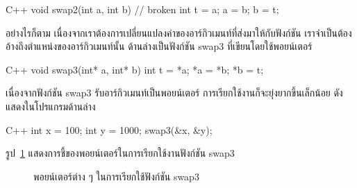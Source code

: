 \latintext
\begin{codelist}{C++}{}
void swap2(int a, int b)    // broken
{
  int t = a;
  a = b;
  b = t;
}
\end{codelist}
\thaitext

อย่างไร{\wbr}ก็{\wbr}ตาม เนื่อง{\wbr}จาก{\wbr}เรา{\wbr}ต้องการ{\wbr}เปลี่ยนแปลง{\wbr}ค่า{\wbr}ของ{\wbr}อาร์{\wbr}กิวเมนท์{\wbr}ที่{\wbr}ส่ง{\wbr}มา{\wbr}ให้{\wbr}กับ{\wbr}ฟังก์ชัน{\wbr}
เรา{\wbr}จำเป็น{\wbr}ต้อง{\wbr}อ้าง{\wbr}ถึง{\wbr}ตำแหน่ง{\wbr}ของ{\wbr}อาร์{\wbr}กิวเมนท์{\wbr}นั้น ด้าน{\wbr}ล่าง{\wbr}เป็น{\wbr}ฟังก์ชัน {\ct swap3}
ที่{\wbr}เขียน{\wbr}โดย{\wbr}ใช้{\wbr}พอยน์เตอร์

\latintext
\begin{codelist}{C++}{}
void swap3(int* a, int* b)
{
  int t = *a;
  *a = *b;
  *b = t;
}
\end{codelist}
\thaitext

เนื่อง{\wbr}จาก{\wbr}ฟังก์ชัน {\ct swap3} รับ{\wbr}อาร์{\wbr}กิวเมนท์{\wbr}เป็น{\wbr}พอยน์เตอร์
การ{\wbr}เรียก{\wbr}ใช้งาน{\wbr}ก็{\wbr}จะ{\wbr}ยุ่งยาก{\wbr}ขึ้น{\wbr}เล็กน้อย ดัง{\wbr}แสดง{\wbr}ใน{\wbr}โปรแกรม{\wbr}ด้าน{\wbr}ล่าง{\wbr}

\latintext
\begin{codelist}{C++}{}
int x = 100;
int y = 1000;
swap3(&x, &y);
\end{codelist}
\thaitext

รูป~\ref{fig:array-swap} แสดง{\wbr}การ{\wbr}ชี้{\wbr}ของ{\wbr}พอยน์เตอร์{\wbr}ใน{\wbr}การ{\wbr}เรียก{\wbr}ใช้งาน{\wbr}ฟังก์ชัน {\ct swap3}

\begin{figure}
\begin{center}
\end{center}
\caption{พอยน์เตอร์{\wbr}ต่าง ๆ ใน{\wbr}การ{\wbr}เรียก{\wbr}ใช้{\wbr}ฟังก์ชัน {\ct swap3}}
\label{fig:array-swap}
\end{figure}


